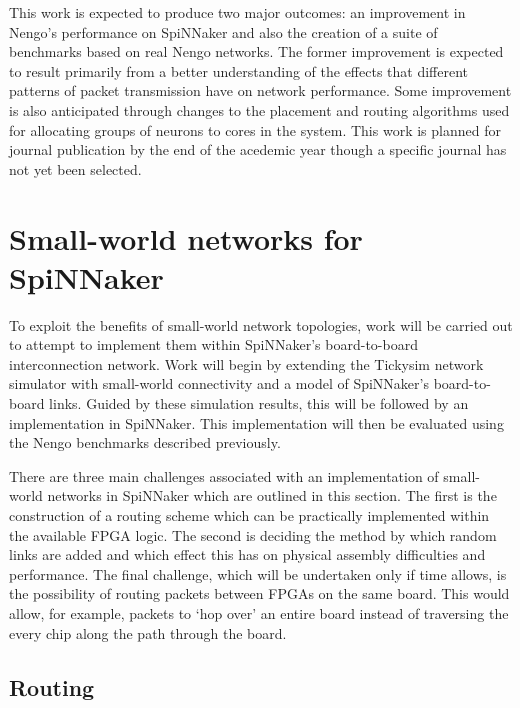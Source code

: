 		This work is expected to produce two major outcomes: an improvement in
		Nengo's performance on SpiNNaker and also the creation of a suite of
		benchmarks based on real Nengo networks. The former improvement is expected
		to result primarily from a better understanding of the effects that
		different patterns of packet transmission have on network performance. Some
		improvement is also anticipated through changes to the placement and routing
		algorithms used for allocating groups of neurons to cores in the system.
		This work is planned for journal publication by the end of the acedemic year
		though a specific journal has not yet been selected.
		
	
	\section{Small-world networks for SpiNNaker}
		
		
		To exploit the benefits of small-world network topologies, work will be
		carried out to attempt to implement them within SpiNNaker's board-to-board
		interconnection network. Work will begin by extending the Tickysim network
		simulator with small-world connectivity and a model of SpiNNaker's
		board-to-board links. Guided by these simulation results, this will be
		followed by an implementation in SpiNNaker.  This implementation will then
		be evaluated using the Nengo benchmarks described previously.
		
		There are three main challenges associated with an implementation of
		small-world networks in SpiNNaker which are outlined in this section. The
		first is the construction of a routing scheme which can be practically
		implemented within the available FPGA logic. The second is deciding the
		method by which random links are added and which effect this has on physical
		assembly difficulties and performance. The final challenge, which will be
		undertaken only if time allows, is the possibility of routing packets
		between FPGAs on the same board. This would allow, for example, packets to
		`hop over' an entire board instead of traversing the every chip along the
		path through the board.
		
		\subsection{Routing}
			
